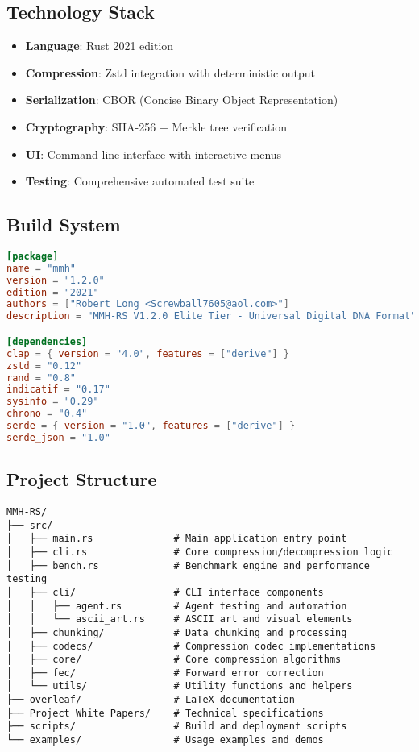 \documentclass[12pt,a4paper]{article}
\begin{document}
\subsection{Technology Stack}
\begin{itemize}
    \item \textbf{Language}: Rust 2021 edition
    \item \textbf{Compression}: Zstd integration with deterministic output
    \item \textbf{Serialization}: CBOR (Concise Binary Object Representation)
    \item \textbf{Cryptography}: SHA-256 + Merkle tree verification
    \item \textbf{UI}: Command-line interface with interactive menus
    \item \textbf{Testing}: Comprehensive automated test suite
\end{itemize}

\subsection{Build System}
\begin{lstlisting}[language=TOML, caption=Cargo Configuration]
[package]
name = "mmh"
version = "1.2.0"
edition = "2021"
authors = ["Robert Long <Screwball7605@aol.com>"]
description = "MMH-RS V1.2.0 Elite Tier - Universal Digital DNA Format"

[dependencies]
clap = { version = "4.0", features = ["derive"] }
zstd = "0.12"
rand = "0.8"
indicatif = "0.17"
sysinfo = "0.29"
chrono = "0.4"
serde = { version = "1.0", features = ["derive"] }
serde_json = "1.0"
\end{lstlisting}

\subsection{Project Structure}
\begin{lstlisting}[caption=Directory Structure]
MMH-RS/
├── src/
│   ├── main.rs              # Main application entry point
│   ├── cli.rs               # Core compression/decompression logic
│   ├── bench.rs             # Benchmark engine and performance testing
│   ├── cli/                 # CLI interface components
│   │   ├── agent.rs         # Agent testing and automation
│   │   └── ascii_art.rs     # ASCII art and visual elements
│   ├── chunking/            # Data chunking and processing
│   ├── codecs/              # Compression codec implementations
│   ├── core/                # Core compression algorithms
│   ├── fec/                 # Forward error correction
│   └── utils/               # Utility functions and helpers
├── overleaf/                # LaTeX documentation
├── Project White Papers/    # Technical specifications
├── scripts/                 # Build and deployment scripts
└── examples/                # Usage examples and demos
\end{lstlisting}
\end{document}
